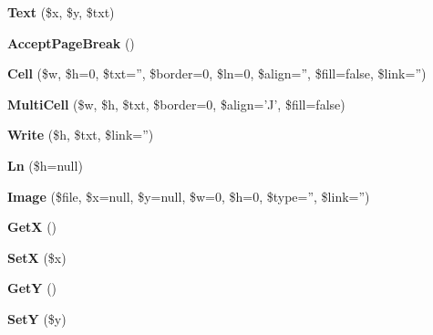 \begin{DoxyCompactItemize}
\item 
\hypertarget{classFPDF_af3354d9f93d576837fba5b157a1a7e37}{{\bfseries Text} (\$x, \$y, \$txt)}\label{classFPDF_af3354d9f93d576837fba5b157a1a7e37}

\item 
\hypertarget{classFPDF_acb406647f47041ae06ec01324e6a2377}{{\bfseries Accept\+Page\+Break} ()}\label{classFPDF_acb406647f47041ae06ec01324e6a2377}

\item 
\hypertarget{classFPDF_a37c88a6a7daf937b3dd88a903ccbfa64}{{\bfseries Cell} (\$w, \$h=0, \$txt='', \$border=0, \$ln=0, \$align='', \$fill=false, \$link='')}\label{classFPDF_a37c88a6a7daf937b3dd88a903ccbfa64}

\item 
\hypertarget{classFPDF_aaa047bd8692257bb2962d5d65c090319}{{\bfseries Multi\+Cell} (\$w, \$h, \$txt, \$border=0, \$align='J', \$fill=false)}\label{classFPDF_aaa047bd8692257bb2962d5d65c090319}

\item 
\hypertarget{classFPDF_a75beddaabec9e3d2b8939bd46f99e615}{{\bfseries Write} (\$h, \$txt, \$link='')}\label{classFPDF_a75beddaabec9e3d2b8939bd46f99e615}

\item 
\hypertarget{classFPDF_a445e0364c7fa330c415495bb31f5651c}{{\bfseries Ln} (\$h=null)}\label{classFPDF_a445e0364c7fa330c415495bb31f5651c}

\item 
\hypertarget{classFPDF_a680c80cc244b5636db22994cf1b27a68}{{\bfseries Image} (\$file, \$x=null, \$y=null, \$w=0, \$h=0, \$type='', \$link='')}\label{classFPDF_a680c80cc244b5636db22994cf1b27a68}

\item 
\hypertarget{classFPDF_a8b7bbc6309142f76ec2a78815f2f700f}{{\bfseries Get\+X} ()}\label{classFPDF_a8b7bbc6309142f76ec2a78815f2f700f}

\item 
\hypertarget{classFPDF_a2bfd055c0ed78a7929fa17ba64f9cf65}{{\bfseries Set\+X} (\$x)}\label{classFPDF_a2bfd055c0ed78a7929fa17ba64f9cf65}

\item 
\hypertarget{classFPDF_a7a0b514eaa73283268ac14e9f0d7f0c4}{{\bfseries Get\+Y} ()}\label{classFPDF_a7a0b514eaa73283268ac14e9f0d7f0c4}

\item 
\hypertarget{classFPDF_a7a0e004fce75cd2cd3501cf54be632e4}{{\bfseries Set\+Y} (\$y)}\label{classFPDF_a7a0e004fce75cd2cd3501cf54be632e4}


\end{DoxyCompactItemize}

